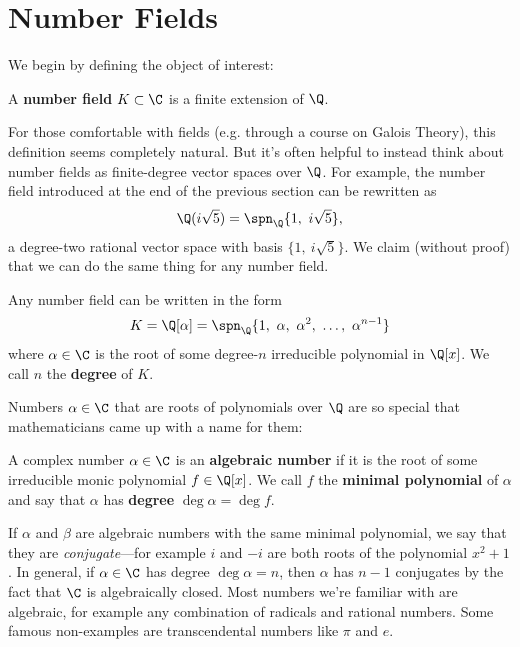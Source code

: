 \section{Number Fields}

We begin by defining the object of interest:

\begin{definition}
    A \textbf{number field} $K \subset \C$ is a finite extension of $\Q$.
\end{definition}

For those comfortable with fields (e.g. through a course on Galois Theory), this definition seems completely natural. But it's often helpful to instead think about number fields as finite-degree vector spaces over $\Q$. For example, the number field introduced at the end of the previous section can be rewritten as
\begin{equation}
    \Q(i \sqrt 5) = \spn_\Q \{ 1, \ i \sqrt 5 \},
\end{equation}
a degree-two rational vector space with basis $\{ 1, \ i \sqrt 5 \}$.
We claim (without proof) that we can do the same thing for any number field.

\begin{theorem}
    Any number field can be written in the form
    \begin{equation*}
        K
        = \Q[\alpha]
        = \spn_\Q \{ 1, \ \alpha, \ \alpha^2, \ \ldots, \ \alpha^{n-1} \}
    \end{equation*}
    where $\alpha \in \C$ is the root of some degree-$n$ irreducible polynomial in $\Q[x]$. We call $n$ the \textbf{degree} of $K$.
\end{theorem}

Numbers $\alpha \in \C$ that are roots of polynomials over $\Q$ are so special that mathematicians came up with a name for them:

\begin{definition}
    A complex number $\alpha \in \C$ is an \textbf{algebraic number} if it is the root of some irreducible monic polynomial $f \in \Q[x]$. We call $f$ the \textbf{minimal polynomial} of $\alpha$ and say that $\alpha$ has \textbf{degree} $\deg \alpha = \deg f$.
\end{definition}

If $\alpha$ and $\beta$ are algebraic numbers with the same minimal polynomial, we say that they are \emph{conjugate}---for example $i$ and $-i$ are both roots of the polynomial $x^2 + 1$. In general, if $\alpha \in \C$ has degree $\deg \alpha = n$, then $\alpha$ has $n - 1$ conjugates by the fact that $\C$ is algebraically closed.
Most numbers we're familiar with are algebraic, for example any combination of radicals and rational numbers. Some famous non-examples are transcendental numbers like $\pi$ and $e$.

